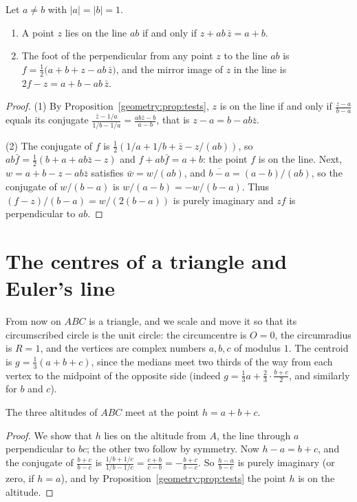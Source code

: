 \begin{lemma}\label{geometry:lem:chord}
Let $a\ne b$ with $|a|=|b|=1$.
\begin{enumerate}
\item A point $z$ lies on the line $ab$ if and only if $z+ab\,\bar z=a+b$.
\item The foot of the perpendicular from any point $z$ to the line $ab$ is $f=\frac12\bigl(a+b+z-ab\,\bar z\bigr)$, and the mirror
image of $z$ in the line is $2f-z=a+b-ab\,\bar z$.
\end{enumerate}
\end{lemma}
\begin{proof}
(1) By Proposition~\ref{geometry:prop:tests}, $z$ is on the line if and only if $\frac{z-a}{b-a}$ equals its conjugate
$\frac{\bar z-1/a}{1/b-1/a}=\frac{ab\bar z-b}{a-b}$, that is $z-a=b-ab\bar z$.

(2) The conjugate of $f$ is $\frac12(1/a+1/b+\bar z-z/(ab))$, so $ab\bar f=\frac12(b+a+ab\bar z-z)$ and $f+ab\bar f=a+b$: the point $f$
is on the line. Next, $w=a+b-z-ab\bar z$ satisfies $\bar w=w/(ab)$, and $\overline{b-a}=(a-b)/(ab)$, so the conjugate of
$w/(b-a)$ is $w/(a-b)=-w/(b-a)$. Thus $(f-z)/(b-a)=w/(2(b-a))$ is purely imaginary and $zf$ is perpendicular to $ab$.
\end{proof}

\section{The centres of a triangle and Euler's line}

From now on $ABC$ is a triangle, and we scale and move it so that its circumscribed circle is the unit circle: the circumcentre is
$O=0$, the circumradius is $R=1$, and the vertices are complex numbers $a,b,c$ of modulus $1$. The centroid is
$g=\frac13(a+b+c)$, since the medians meet two thirds of the way from each vertex to the midpoint of the opposite side (indeed
$g=\frac13a+\frac23\cdot\frac{b+c}2$, and similarly for $b$ and $c$).

\begin{proposition}\label{geometry:prop:orthocentre}
The three altitudes of $ABC$ meet at the point $h=a+b+c$.
\end{proposition}
\begin{proof}
We show that $h$ lies on the altitude from $A$, the line through $a$ perpendicular to $bc$; the other two follow by symmetry. Now
$h-a=b+c$, and the conjugate of $\frac{b+c}{b-c}$ is $\frac{1/b+1/c}{1/b-1/c}=\frac{c+b}{c-b}=-\frac{b+c}{b-c}$. So $\frac{h-a}{b-c}$
is purely imaginary (or zero, if $h=a$), and by Proposition~\ref{geometry:prop:tests} the point $h$ is on the altitude.
\end{proof}

